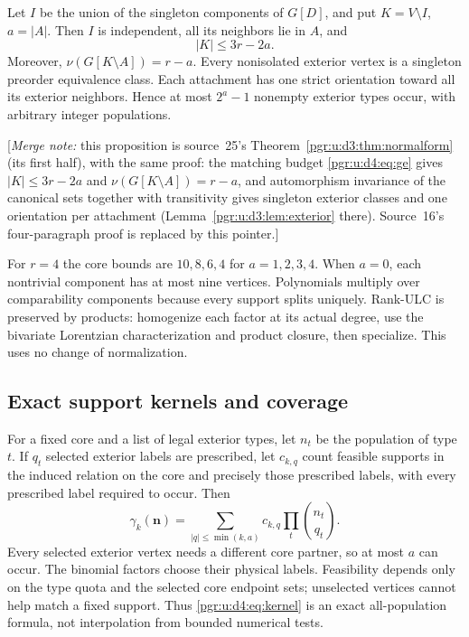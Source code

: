 \documentclass[11pt]{article}
\numberwithin{equation}{section}
\theoremstyle{definition}\newtheorem{definition}[theorem]{Definition}\newtheorem{remark}[theorem]{Remark}
\newcommand{\mnote}[1]{[\textit{Merge note:} #1]}
\begin{document}
\begin{proposition}\label{pgr:u:d4:prop:normal}
Let $I$ be the union of the singleton components of $G[D]$, and put $K=V\setminus I$, $a=|A|$. Then $I$ is independent, all its neighbors lie in $A$, and
\[
 |K|\le3r-2a.
\]
Moreover, $\nu(G[K\setminus A])=r-a$. Every nonisolated exterior vertex is a singleton preorder equivalence class. Each attachment has one strict orientation toward all its exterior neighbors. Hence at most $2^a-1$ nonempty exterior types occur, with arbitrary integer populations.
\end{proposition}

\mnote{this proposition is source~25's Theorem~\ref{pgr:u:d3:thm:normalform}
(its first half), with the same proof: the matching budget
\eqref{pgr:u:d4:eq:ge} gives $|K|\le3r-2a$ and $\nu(G[K\setminus A])=r-a$,
and automorphism invariance of the canonical sets together with
transitivity gives singleton exterior classes and one orientation per
attachment (Lemma~\ref{pgr:u:d3:lem:exterior} there). Source~16's
four-paragraph proof is replaced by this pointer.}

For $r=4$ the core bounds are $10,8,6,4$ for $a=1,2,3,4$. When $a=0$, each nontrivial component has at most nine vertices. Polynomials multiply over comparability components because every support splits uniquely. Rank-ULC is preserved by products: homogenize each factor at its actual degree, use the bivariate Lorentzian characterization and product closure, then specialize. This uses no change of normalization.

\subsection{Exact support kernels and coverage}
For a fixed core and a list of legal exterior types, let $n_t$ be the population of type $t$. If $q_t$ selected exterior labels are prescribed, let $c_{k,q}$ count feasible supports in the induced relation on the core and precisely those prescribed labels, with every prescribed label required to occur. Then
\begin{equation}\label{pgr:u:d4:eq:kernel}
 \gamma_k(\mathbf n)=\sum_{|q|\le\min(k,a)}c_{k,q}\prod_t\binom{n_t}{q_t}.
\end{equation}
Every selected exterior vertex needs a different core partner, so at most $a$ can occur. The binomial factors choose their physical labels. Feasibility depends only on the type quota and the selected core endpoint sets; unselected vertices cannot help match a fixed support. Thus \eqref{pgr:u:d4:eq:kernel} is an exact all-population formula, not interpolation from bounded numerical tests.
\end{document}
